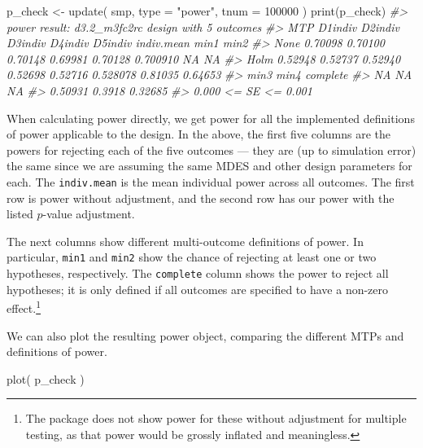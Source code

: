 \documentclass[
]{article}
\newenvironment{Shaded}{\begin{snugshade}}{\end{snugshade}}
\newcommand{\AttributeTok}[1]{\textcolor[rgb]{0.77,0.63,0.00}{#1}}
\newcommand{\CommentTok}[1]{\textcolor[rgb]{0.56,0.35,0.01}{\textit{#1}}}
\newcommand{\DecValTok}[1]{\textcolor[rgb]{0.00,0.00,0.81}{#1}}
\newcommand{\FunctionTok}[1]{\textcolor[rgb]{0.00,0.00,0.00}{#1}}
\newcommand{\NormalTok}[1]{#1}
\newcommand{\OtherTok}[1]{\textcolor[rgb]{0.56,0.35,0.01}{#1}}
\newcommand{\StringTok}[1]{\textcolor[rgb]{0.31,0.60,0.02}{#1}}
\begin{document}
\begin{Shaded}
\begin{Highlighting}[]
\NormalTok{p\_check }\OtherTok{\textless{}{-}} \FunctionTok{update}\NormalTok{( smp, }\AttributeTok{type =} \StringTok{"power"}\NormalTok{, }\AttributeTok{tnum =} \DecValTok{100000}\NormalTok{ )}
\FunctionTok{print}\NormalTok{(p\_check)}
\CommentTok{\#\textgreater{} power result: d3.2\_m3fc2rc design with 5 outcomes}
\CommentTok{\#\textgreater{}   MTP D1indiv D2indiv D3indiv D4indiv D5indiv indiv.mean    min1    min2}
\CommentTok{\#\textgreater{}  None 0.70098 0.70100 0.70148 0.69981 0.70128   0.700910      NA      NA}
\CommentTok{\#\textgreater{}  Holm 0.52948 0.52737 0.52940 0.52698 0.52716   0.528078 0.81035 0.64653}
\CommentTok{\#\textgreater{}     min3   min4 complete}
\CommentTok{\#\textgreater{}       NA     NA       NA}
\CommentTok{\#\textgreater{}  0.50931 0.3918  0.32685}
\CommentTok{\#\textgreater{}  0.000 \textless{}= SE \textless{}= 0.001}
\end{Highlighting}
\end{Shaded}

When calculating power directly, we get power for all the implemented
definitions of power applicable to the design. In the above, the first
five columns are the powers for rejecting each of the five outcomes ---
they are (up to simulation error) the same since we are assuming the
same MDES and other design parameters for each. The \texttt{indiv.mean}
is the mean individual power across all outcomes. The first row is power
without adjustment, and the second row has our power with the listed
\(p\)-value adjustment.

The next columns show different multi-outcome definitions of power. In
particular, \texttt{min1} and \texttt{min2} show the chance of rejecting
at least one or two hypotheses, respectively. The \texttt{complete}
column shows the power to reject all hypotheses; it is only defined if
all outcomes are specified to have a non-zero
effect.\footnote{The package does not show power for these without adjustment for multiple testing, as that power would be grossly inflated and meaningless.}

We can also plot the resulting power object, comparing the different
MTPs and definitions of power.

\begin{Shaded}
\begin{Highlighting}[]
\FunctionTok{plot}\NormalTok{( p\_check )}
\end{Highlighting}
\end{Shaded}
\end{document}
